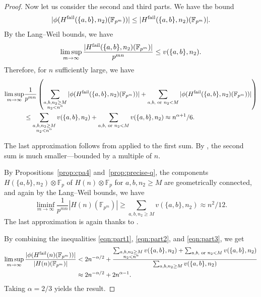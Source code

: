 \documentclass{amsart}
\numberwithin{equation}{section} \numberwithin{figure}{section}
\newcommand\FF{\mathbb{F}}
\theoremstyle{one}
\theoremstyle{definition}
\begin{document}
\begin{proof}
  Now let us consider the second and third parts.
  We have the bound
  \[|\phi (H^{\rm fail}(\{a,b\},n_2)(\FF_{p^m}))| \leq |H^{\rm fail}(\{a,b\},n_2)(\FF_{p^m})|.\]
  By the Lang--Weil bounds, we have
  \[ \limsup_{m \to \infty} \frac{|H^{\rm fail}(\{a,b\},n_2)(\FF_{p^m})|}{p^{mn}} \leq v(\{a,b\},n_2).\]
  Therefore, for $n$ sufficiently large, we have
\begin{equation}\label{eqn:part2}
    \begin{split}
      \limsup_{m \to \infty} &\frac{1}{p^{mn}}\left(\sum_{\substack{a, b, n_2 \geq M\\ n_2 < n^{\alpha}}} |\phi (H^{\rm fail}(\{a,b\},n_2)(\FF_{p^m}))| + \sum_{a,b,\text{ or } n_2 < M} |\phi (H^{\rm fail}(\{a,b\},n_2)(\FF_{p^m}))| \right) \\
      & \leq \sum_{\substack{a, b, n_2 \geq M\\ n_2 < n^{\alpha}}} v(\{a,b\},n_2) + \sum_{a,b,\text{ or } n_2 < M} v(\{a,b\},n_2) \approx n^{\alpha+1}/6.
    \end{split}
  \end{equation}

  
  The last approximation follows from  applied to the first sum.
  By , the second sum is much smaller---bounded by a multiple of \(n\).

  By Propositions~\ref{prop:cpa4} and~\ref{prop:precise-q}, the components \(H(\{a,b\},n_2) \otimes \FF_p\) of \(H(n) \otimes \FF_p\) for \(a,b,n_2 \geq M\) are geometrically connected, and again by the Lang--Weil bounds, we have
  \begin{equation}\label{eqn:part3}
    \liminf_{m \to \infty} \frac{1}{p^{mn}} |H(n)(\FF_{p^m})| \geq \sum_{a,b,n_2 \geq M} v(\{a,b\},n_2) \approx n^2/12.
  \end{equation}
  The last approximation is again thanks to .

  By combining the inequalities \eqref{eqn:part1}, \eqref{eqn:part2}, and \eqref{eqn:part3}, we get
  \begin{equation}
    \begin{split}
      \limsup_{m \to \infty} \frac{|\phi(H^{\rm fail}(n)(\FF_{p^m}))|}{|H(n)(\FF_{p^m})|} &< 2n^{-\alpha/2} + \frac{\sum_{\substack{a, b, n_2 \geq M\\ n_2 < n^{\alpha}}} v(\{a,b\},n_2) + \sum_{a,b,\text{ or } n_2 < M} v(\{a,b\},n_2)}{\sum_{a,b,n_2 \geq M}v(\{a,b\},n_2)}\\
      &\approx 2n^{-\alpha/2} + 2 n^{\alpha - 1}.
    \end{split}
  \end{equation}
Taking \(\alpha = 2/3\) yields the result.
\end{proof}
\end{document}
